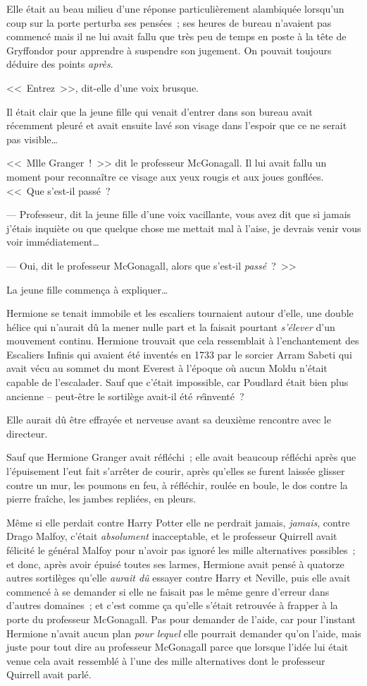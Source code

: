 Elle était au beau milieu d'une réponse particulièrement alambiquée lorsqu'un coup sur la porte perturba ses pensées~; ses heures de bureau n'avaient pas commencé mais il ne lui avait fallu que très peu de temps en poste à la tête de Gryffondor pour apprendre à suspendre son jugement. On pouvait toujours déduire des points \emph{après}.

<<~Entrez~>>, dit-elle d'une voix brusque.

Il était clair que la jeune fille qui venait d'entrer dans son bureau avait récemment pleuré et avait ensuite lavé son visage dans l'espoir que ce ne serait pas visible…

<<~Mlle Granger~!~>> dit le professeur McGonagall. Il lui avait fallu un moment pour reconnaître ce visage aux yeux rougis et aux joues gonflées. <<~Que s'est-il passé~?

--- Professeur, dit la jeune fille d'une voix vacillante, vous avez dit que si jamais j'étais inquiète ou que quelque chose me mettait mal à l'aise, je devrais venir vous voir immédiatement…

--- Oui, dit le professeur McGonagall, alors que s'est-il \emph{passé}~?~>>

La jeune fille commença à expliquer…

\later

Hermione se tenait immobile et les escaliers tournaient autour d'elle, une double hélice qui n'aurait dû la mener nulle part et la faisait pourtant \emph{s'élever} d'un mouvement continu. Hermione trouvait que cela ressemblait à l'enchantement des Escaliers Infinis qui avaient été inventés en 1733 par le sorcier Arram Sabeti qui avait vécu au sommet du mont Everest à l'époque où aucun Moldu n'était capable de l'escalader. Sauf que c'était impossible, car Poudlard était bien plus ancienne -- peut-être le sortilège avait-il été \emph{ré}inventé~?

Elle aurait dû être effrayée et nerveuse avant sa deuxième rencontre avec le directeur.

Sauf que Hermione Granger avait réfléchi~; elle avait beaucoup réfléchi après que l'épuisement l'eut fait s'arrêter de courir, après qu'elles se furent laissée glisser contre un mur, les poumons en feu, à réfléchir, roulée en boule, le dos contre la pierre fraîche, les jambes repliées, en pleurs.

Même si elle perdait contre Harry Potter elle ne perdrait jamais, \emph{jamais}, contre Drago Malfoy, c'était \emph{absolument} inacceptable, et le professeur Quirrell avait félicité le général Malfoy pour n'avoir pas ignoré les mille alternatives possibles~; et donc, après avoir épuisé toutes ses larmes, Hermione avait pensé à quatorze autres sortilèges qu'elle \emph{aurait dû} essayer contre Harry et Neville, puis elle avait commencé à se demander si elle ne faisait pas le même genre d'erreur dans d'autres domaines~; et c'est comme ça qu'elle s'était retrouvée à frapper à la porte du professeur McGonagall. Pas pour demander de l'aide, car pour l'instant Hermione n'avait aucun plan \emph{pour lequel} elle pourrait demander qu'on l'aide, mais juste pour tout dire au professeur McGonagall parce que lorsque l'idée lui était venue cela avait ressemblé à l'une des mille alternatives dont le professeur Quirrell avait parlé.

